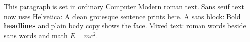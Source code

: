 \documentclass{article}
\begin{document}
This paragraph is set in ordinary Computer Modern roman text.
Sans serif text now uses Helvetica: \textsf{A clean grotesque sentence} prints here.
A sans block: {\sffamily Bold \textbf{headlines} and plain body copy} shows the face.
Mixed text: roman words beside \textsf{sans words} and math $E = mc^2$.
\end{document}
